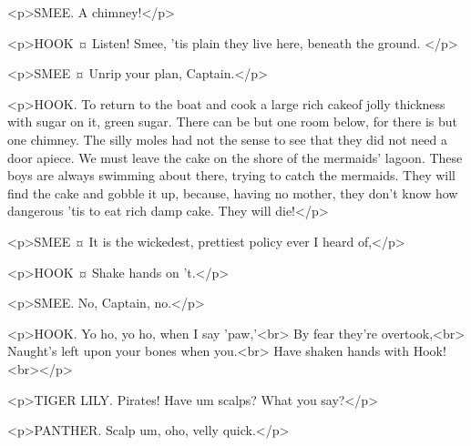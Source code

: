 <p>SMEE. A chimney!</p>

<p>HOOK ¤
Listen! Smee, 'tis plain they live here, beneath the ground.
</p>

<p>SMEE ¤
Unrip your plan, Captain.</p>

<p>HOOK. To return to the boat and cook a large rich cakeof jolly thickness with sugar on it, green sugar. There can be but one room below, for there is but one chimney. The silly moles had not the sense to see that they did not need a door apiece. We must leave the cake on the shore of the mermaids' lagoon. These boys are always swimming about there, trying to catch the mermaids. They will find the cake and gobble it up, because, having no mother, they don't know how dangerous 'tis to eat rich damp cake. They will die!</p>

<p>SMEE ¤
It is the wickedest, prettiest policy ever I heard of,</p>

<p>HOOK ¤
Shake hands on 't.</p>

<p>SMEE. No, Captain, no.</p>


<p>HOOK. Yo ho, yo ho, when I say 'paw,'<br> By fear they're overtook,<br> Naught's left upon your bones when you.<br> Have shaken hands with Hook!<br></p>


<p>TIGER LILY. Pirates!
Have um scalps? What you say?</p>

<p>PANTHER. Scalp um, oho, velly quick.</p>

